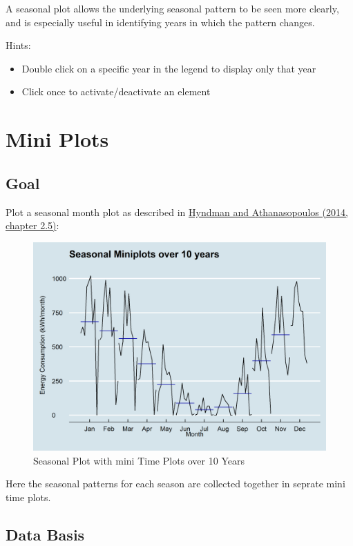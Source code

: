 \documentclass[
  a4paperpaper,
]{book}
\providecommand{\tightlist}{%
  \setlength{\itemsep}{0pt}\setlength{\parskip}{0pt}}
\begin{document}
A seasonal plot allows the underlying seasonal pattern to be seen more clearly, and is especially useful in identifying years in which the pattern changes.

Hints:

\begin{itemize}
\tightlist
\item
  Double click on a specific year in the legend to display only that year
\item
  Click once to activate/deactivate an element
\end{itemize}

\newpage

\hypertarget{mini-plots}{%
\section{Mini Plots}\label{mini-plots}}

\hypertarget{goal-1}{%
\subsection{Goal}\label{goal-1}}

Plot a seasonal month plot as described in \href{https://otexts.com/fpp2/seasonal-subseries-plots.html}{Hyndman and Athanasopoulos (2014, chapter 2.5)}:

\begin{figure}
\includegraphics[width=0.7\linewidth]{images/plotSeasonalMiniplots} \caption{Seasonal Plot with mini Time Plots over 10 Years}\label{fig:unnamed-chunk-10}
\end{figure}

Here the seasonal patterns for each season are collected together in seprate mini time plots.

\hypertarget{data-basis-1}{%
\subsection{Data Basis}\label{data-basis-1}}
\end{document}
